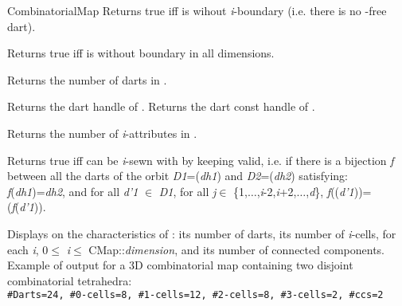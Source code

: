 \begin{ccRefConcept}{CombinatorialMap}
         {Returns true iff  is wihout \emph{i}-boundary
          (i.e. there is no -free dart).
          }

         {Returns true iff  is without boundary in all dimensions.}

    {Returns the number of darts in .}

    {Returns the dart handle of .}
\ccGlue
{}
    {Returns the dart const handle of .}


   {Returns the number of \emph{i}-attributes in . 
     }

         {Returns true iff  can be \emph{i}-sewn with  by 
           keeping  valid, i.e. if there is
           a bijection \emph{f} between all the darts of the orbit
           \emph{D1}=\orbit{\betaun{},$\ldots$,\betaimdeux{},\betaipdeux{},$\ldots$,\betad{}}(\emph{dh1}) and
           \emph{D2}=\orbit{\betaun{},$\ldots$,\betaimdeux{},\betaipdeux{},$\ldots$,\betad{}}(\emph{dh2})
           satisfying: \emph{f}(\emph{dh1})=\emph{dh2}, and for all \emph{d'1} $\in$ \emph{D1}, for all \emph{j}$\in$
           \{1,$\ldots$,\emph{i}-2,\emph{i}+2,$\ldots$,\emph{d}\},
           \emph{f}(\betaj{}(\emph{d'1}))=\betajinv{}(\emph{f}(\emph{d'1})).           
          }	

{Displays on  the characteristics of : its number of darts, 
  its number of \emph{i}-cells, for each \emph{i}, 0$\leq$ \emph{i}$\leq$ CMap::\emph{dimension}, 
  and its number of connected components.}
Example of output for a 3D combinatorial map containing two disjoint
combinatorial tetrahedra:\\
\texttt{\#Darts=24, \#0-cells=8, \#1-cells=12, \#2-cells=8, \#3-cells=2, \#ccs=2}



\end{ccRefConcept}
